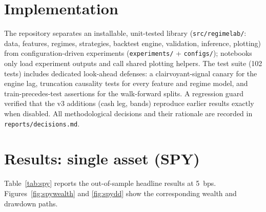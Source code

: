 \documentclass[11pt]{article}
\newcommand{\code}[1]{\texttt{#1}}
\begin{document}
\section{Implementation}

The repository separates an installable, unit-tested library
(\code{src/regimelab/}: data, features, regimes, strategies, backtest engine,
validation, inference, plotting) from configuration-driven experiments
(\code{experiments/} + \code{configs/}); notebooks only load experiment
outputs and call shared plotting helpers. The test suite (102 tests) includes
dedicated look-ahead defenses: a clairvoyant-signal canary for the engine lag,
truncation causality tests for every feature and regime model, and
train-precedes-test assertions for the walk-forward splits. A regression guard
verified that the v3 additions (cash leg, bands) reproduce earlier results
exactly when disabled. All methodological decisions and their rationale are
recorded in \code{reports/decisions.md}.

\section{Results: single asset (SPY)}

Table~\ref{tab:spy} reports the out-of-sample headline results at 5~bps.
Figures~\ref{fig:spywealth} and \ref{fig:spydd} show the corresponding wealth
and drawdown paths.
\end{document}
